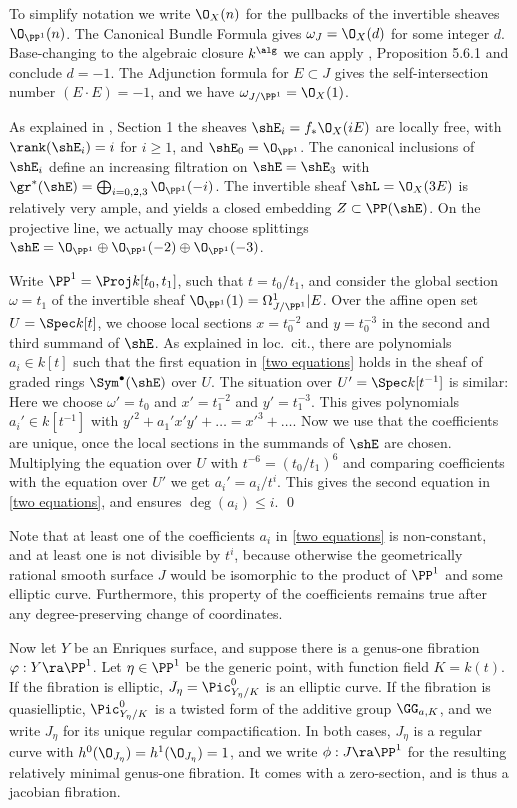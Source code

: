 \proof
To simplify notation we write $\O_X(n)$ for the pullbacks of the invertible sheaves $\O_{\PP^1}(n)$.
The Canonical Bundle Formula \cite{Bombieri-Mumford-1977} gives $\omega_J=\O_X(d)$ for some integer $d$.
Base-changing to the algebraic closure $k^\alg$ we can apply \cite{Cossec-Dolgachev-1989}, Proposition 5.6.1 and conclude $d=-1$.
The Adjunction formula for $E\subset J$ gives the self-intersection number $(E\cdot E)=-1$,
and we have $\omega_{J/\PP^1}=\O_X(1)$.

As explained in \cite{Deligne-1975}, Section 1 the sheaves $\shE_i=f_*\O_X(iE)$ are locally free,
with $\rank(\shE_i)=i$ for  $i\geq 1$, and $\shE_0=\O_{\PP^1}$. The canonical inclusions of $\shE_i$
define an increasing filtration on $\shE=\shE_3$ with $\gr^*(\shE)=\bigoplus_{i=0,2,3}\O_{\PP^1}(-i)$.
The invertible sheaf $\shL=\O_X(3E)$ is relatively very ample, and yields a closed embedding
$Z\subset\PP(\shE)$.
On the projective line, we actually may choose splittings $\shE=\O_{\PP^1} \oplus\O_{\PP^1}(-2)\oplus\O_{\PP^1}(-3)$.

Write $\PP^1=\Proj k[t_0,t_1]$, such that $t=t_0/t_1$, and consider the global section $\omega=t_1$
of the invertible sheaf
$\O_{\PP^1}(1)=\Omega^1_{J/\PP^1}|E$. Over the affine open set $U=\Spec k[t]$, we choose local sections $x=t_0^{-2}$
and $y=t_0^{-3}$ in the second and third summand of $\shE$.
As explained in loc.\ cit., there are  polynomials $a_i\in k[t]$ such that
the first equation in \eqref{two equations} holds in the sheaf of graded rings $\Sym^\bullet(\shE)$ over $U$.
The situation over $U'=\Spec k[t^{-1}]$ is similar: Here we choose $\omega'=t_0$ and $x'=t_1^{-2} $ and $y'=t_1^{-3}$.
This gives polynomials $a_i'\in k[t^{-1}]$ with
$y'^2+a_1'x'y'+\ldots = x'^3+\ldots$. Now we use that the  coefficients are unique, once the local sections
in the summands of $\shE$ are chosen.
Multiplying the equation over $U$ with $t^{-6}=(t_0/t_1)^6$ and comparing coefficients with the equation over $U'$
we get $a_i'=a_i/t^i$. This gives the second equation in \eqref{two equations}, and  ensures $\deg(a_i)\leq i$.
\qed


Note that at least one of the  coefficients $a_i$ in  \eqref{two equations} is non-constant, and at least one is not divisible by $t^i$,
because otherwise the geometrically rational smooth surface $J$ would be isomorphic to the product of $\PP^1$ and some elliptic curve.
Furthermore, this property of the coefficients remains  true after any degree-preserving change of coordinates.

Now let $Y$ be an Enriques surface, and suppose there is a genus-one fibration $\varphi:Y\ra\PP^1$.
Let $\eta\in\PP^1$ be the generic point, with function field $K=k(t)$.
If the fibration is elliptic, $J_\eta=\Pic^0_{Y_\eta/K}$ is an elliptic curve.
If the fibration is quasielliptic, $\Pic^0_{Y_\eta/K}$ is a twisted form of the additive group $\GG_{a,K}$,
and we write $J_\eta$ for its unique regular compactification.
In both cases, $J_\eta$ is a regular curve with $h^0(\O_{J_\eta})=h^1(\O_{J_\eta})=1$, and we write
$\phi:J\ra\PP^1$ for the resulting relatively minimal genus-one fibration.
It comes with a zero-section,  and is thus a jacobian fibration.

